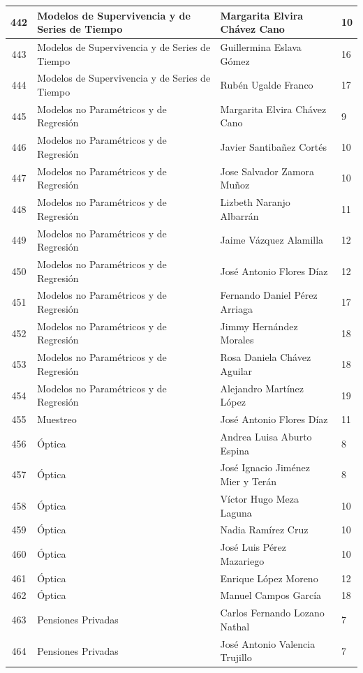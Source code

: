 {\begin{longtable}{|c|p{6.5cm}|p{5cm}|p{1.5cm}|}
442 & Modelos de Supervivencia y de Series de Tiempo & Margarita Elvira Chávez Cano & 10 \\ \hline
443 & Modelos de Supervivencia y de Series de Tiempo & Guillermina Eslava Gómez & 16 \\ \hline
444 & Modelos de Supervivencia y de Series de Tiempo & Rubén Ugalde Franco & 17 \\ \hline
445 & Modelos no Paramétricos y de Regresión & Margarita Elvira Chávez Cano & 9 \\ \hline
446 & Modelos no Paramétricos y de Regresión & Javier Santibañez Cortés & 10 \\ \hline
447 & Modelos no Paramétricos y de Regresión & Jose Salvador Zamora Muñoz & 10 \\ \hline
448 & Modelos no Paramétricos y de Regresión & Lizbeth Naranjo Albarrán & 11 \\ \hline
449 & Modelos no Paramétricos y de Regresión & Jaime Vázquez Alamilla & 12 \\ \hline
450 & Modelos no Paramétricos y de Regresión & José Antonio Flores Díaz & 12 \\ \hline
451 & Modelos no Paramétricos y de Regresión & Fernando Daniel Pérez Arriaga & 17 \\ \hline
452 & Modelos no Paramétricos y de Regresión & Jimmy Hernández Morales & 18 \\ \hline
453 & Modelos no Paramétricos y de Regresión & Rosa Daniela Chávez Aguilar & 18 \\ \hline
454 & Modelos no Paramétricos y de Regresión & Alejandro Martínez López & 19 \\ \hline
455 & Muestreo & José Antonio Flores Díaz & 11 \\ \hline
456 & Óptica & Andrea Luisa Aburto Espina & 8 \\ \hline
457 & Óptica & José Ignacio Jiménez Mier y Terán & 8 \\ \hline
458 & Óptica & Víctor Hugo Meza Laguna & 10 \\ \hline
459 & Óptica & Nadia Ramírez Cruz & 10 \\ \hline
460 & Óptica & José Luis Pérez Mazariego & 10 \\ \hline
461 & Óptica & Enrique López Moreno & 12 \\ \hline
462 & Óptica & Manuel Campos García & 18 \\ \hline
463 & Pensiones Privadas & Carlos Fernando Lozano Nathal & 7 \\ \hline
464 & Pensiones Privadas & José Antonio Valencia Trujillo & 7 \\ \hline

\end{longtable}}
